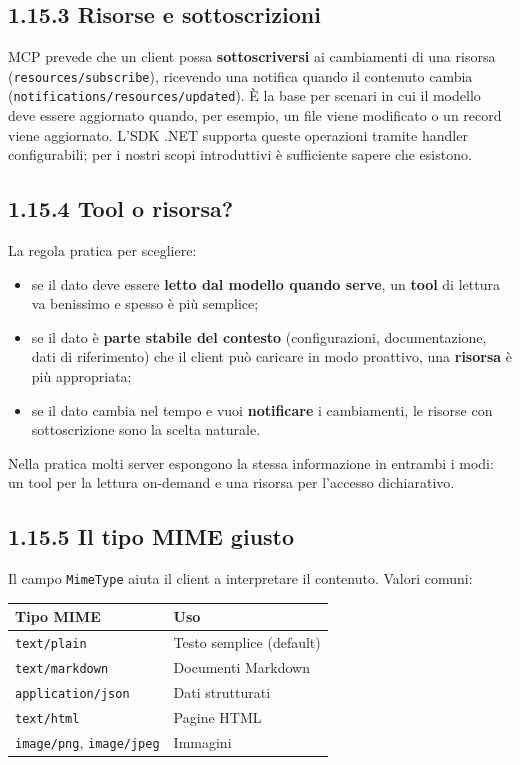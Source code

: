 \documentclass[
  italian,
  10pt,
]{book}
\newcounter{none} %
\providecommand{\tightlist}{%
  \setlength{\itemsep}{0pt}\setlength{\parskip}{0pt}}
\begin{document}
\subsection{1.15.3 Risorse e
sottoscrizioni}\label{risorse-e-sottoscrizioni}

MCP prevede che un client possa \textbf{sottoscriversi} ai cambiamenti
di una risorsa (\texttt{resources/subscribe}), ricevendo una notifica
quando il contenuto cambia (\texttt{notifications/resources/updated}). È
la base per scenari in cui il modello deve essere aggiornato quando, per
esempio, un file viene modificato o un record viene aggiornato. L'SDK
.NET supporta queste operazioni tramite handler configurabili; per i
nostri scopi introduttivi è sufficiente sapere che esistono.

\subsection{1.15.4 Tool o risorsa?}\label{tool-o-risorsa}

La regola pratica per scegliere:

\begin{itemize}
\tightlist
\item
  se il dato deve essere \textbf{letto dal modello quando serve}, un
  \textbf{tool} di lettura va benissimo e spesso è più semplice;
\item
  se il dato è \textbf{parte stabile del contesto} (configurazioni,
  documentazione, dati di riferimento) che il client può caricare in
  modo proattivo, una \textbf{risorsa} è più appropriata;
\item
  se il dato cambia nel tempo e vuoi \textbf{notificare} i cambiamenti,
  le risorse con sottoscrizione sono la scelta naturale.
\end{itemize}

Nella pratica molti server espongono la stessa informazione in entrambi
i modi: un tool per la lettura on-demand e una risorsa per l'accesso
dichiarativo.

\subsection{1.15.5 Il tipo MIME giusto}\label{il-tipo-mime-giusto}

Il campo \texttt{MimeType} aiuta il client a interpretare il contenuto.
Valori comuni:

{\def\LTcaptype{none} %
\begin{longtable}[]{@{}ll@{}}
\toprule\noalign{}
Tipo MIME & Uso \\
\midrule\noalign{}
\endhead
\bottomrule\noalign{}
\endlastfoot
\texttt{text/plain} & Testo semplice (default) \\
\texttt{text/markdown} & Documenti Markdown \\
\texttt{application/json} & Dati strutturati \\
\texttt{text/html} & Pagine HTML \\
\texttt{image/png}, \texttt{image/jpeg} & Immagini \\
\end{longtable}
}
\end{document}
